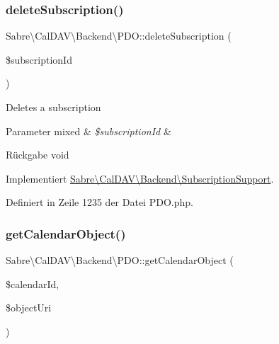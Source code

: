 \subsubsection{\texorpdfstring{delete\+Subscription()}{deleteSubscription()}}
{\footnotesize\ttfamily Sabre\textbackslash{}\+Cal\+D\+A\+V\textbackslash{}\+Backend\textbackslash{}\+P\+D\+O\+::delete\+Subscription (\begin{DoxyParamCaption}\item[{}]{\$subscription\+Id }\end{DoxyParamCaption})}

Deletes a subscription


\begin{DoxyParams}[1]{Parameter}
mixed & {\em \$subscription\+Id} & \\
\hline
\end{DoxyParams}
\begin{DoxyReturn}{Rückgabe}
void 
\end{DoxyReturn}


Implementiert \mbox{\hyperlink{interface_sabre_1_1_cal_d_a_v_1_1_backend_1_1_subscription_support_adaaf00fe6295b0809c84e9b78cdae5e3}{Sabre\textbackslash{}\+Cal\+D\+A\+V\textbackslash{}\+Backend\textbackslash{}\+Subscription\+Support}}.



Definiert in Zeile 1235 der Datei P\+D\+O.\+php.

\mbox{\label{class_sabre_1_1_cal_d_a_v_1_1_backend_1_1_p_d_o_a730b64c39c9ec9fd75b2c185ff7890f3}} 
\subsubsection{\texorpdfstring{get\+Calendar\+Object()}{getCalendarObject()}}
{\footnotesize\ttfamily Sabre\textbackslash{}\+Cal\+D\+A\+V\textbackslash{}\+Backend\textbackslash{}\+P\+D\+O\+::get\+Calendar\+Object (\begin{DoxyParamCaption}\item[{}]{\$calendar\+Id,  }\item[{}]{\$object\+Uri }\end{DoxyParamCaption})}


